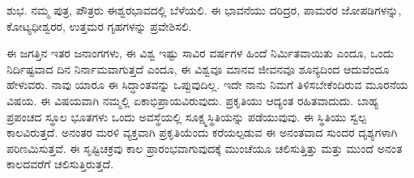ಶುಭ. ನಮ್ಮ ಪುತ್ರ, ಪೌತ್ರರು ಈಶ್ವರಭಾವದಲ್ಲಿ ಬೆಳೆಯಲಿ. ಈ ಭಾವನೆಯು ದರಿದ್ರರ, ಪಾಮರರ ಜೋಪಡಿಗಳನ್ನು, ಕೋಟ್ಯಧೀಶ್ವರರ, ಉತ್ತಮರ ಗೃಹಗಳನ್ನು ಪ್ರವೇಶಿಸಲಿ.

\vskip 5pt

ಈ ಜಗತ್ತಿನ ಇತರ ಜನಾಂಗಗಳು, ಈ ವಿಶ್ವ ಇಷ್ಟು ಸಾವಿರ ವರ್ಷಗಳ ಹಿಂದೆ ನಿರ್ಮಿತವಾಯಿತು ಎಂದೂ, ಒಂದು ನಿರ್ದಿಷ್ಟವಾದ ದಿನ ನಿರ್ನಾಮವಾಗುತ್ತದೆ ಎಂದೂ, ಈ ವಿಶ್ವವೂ ಮಾನವ ಜೀವನವೂ ಶೂನ್ಯದಿಂದ ಆದುವೆಂದೂ ಹೇಳುವರು. ನಾವು ಯಾರೂ ಈ ಸಿದ್ಧಾಂತವನ್ನು ಒಪ್ಪುವುದಿಲ್ಲ. ಇದೇ ನಾನು ನಿಮಗೆ ತಿಳಿಸಬೇಕೆಂದಿರುವ ಮೂರನೆಯ ವಿಷಯ. ಈ ವಿಷಯವಾಗಿ ನಮ್ಮಲ್ಲಿ ಏಕಾಭಿಪ್ರಾಯವಿರುವುದು. ಪ್ರಕೃತಿಯು ಆದ್ಯಂತ ರಹಿತವಾದುದು. ಬಾಹ್ಯ ಪ್ರಪಂಚದ ಸ್ಥೂಲ ಭೂತಗಳು ಒಂದು ಅವಸ್ಥೆಯಲ್ಲಿ ಸೂಕ್ಷ್ಮಸ್ಥಿತಿಯನ್ನು ಪಡೆಯುವುವು. ಈ ಸ್ಥಿತಿಯು ಸ್ವಲ್ಪ ಕಾಲವಿರುತ್ತದೆ. ಅನಂತರ ಮರಳಿ ವ್ಯಕ್ತವಾಗಿ ಪ್ರಕೃತಿಯೆಂದು ಕರೆಯಲ್ಪಡುವ ಈ ಅನಂತವಾದ ಸುಂದರ ದೃಶ್ಯಗಳಾಗಿ ಪರಿಣಮಿಸುತ್ತವೆ. ಈ ಸೃಷ್ಟಿಚಕ್ರವು ಕಾಲ ಪ್ರಾರಂಭವಾಗುವುದಕ್ಕೆ ಮುಂಚೆಯೂ ಚಲಿಸುತ್ತಿತ್ತು ಮತ್ತು ಮುಂದೆ ಅನಂತ ಕಾಲದವರೆಗೆ ಚಲಿಸುತ್ತಿರುತ್ತದೆ.

\vskip 5pt

